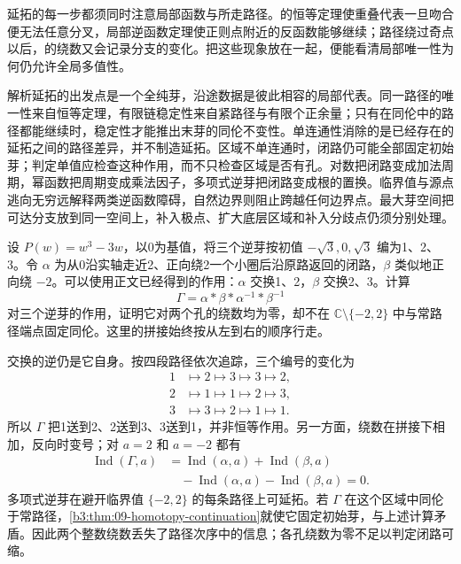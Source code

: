 \ProseParagraphBreak
延拓的每一步都须同时注意局部函数与所走路径。的恒等定理使重叠代表一旦吻合便无法任意分叉，局部逆函数定理使正则点附近的反函数能够继续；路径绕过奇点以后，的绕数又会记录分支的变化。把这些现象放在一起，便能看清局部唯一性为何仍允许全局多值性。





\begin{chaptersummary}
解析延拓的出发点是一个全纯芽，沿途数据是彼此相容的局部代表。同一路径的唯一性来自恒等定理，有限链稳定性来自紧路径与有限个正余量；只有在同伦中的路径都能继续时，稳定性才能推出末芽的同伦不变性。单连通性消除的是已经存在的延拓之间的路径差异，并不制造延拓。区域不单连通时，闭路仍可能全部固定初始芽；判定单值应检查这种作用，而不只检查区域是否有孔。对数把闭路变成加法周期，幂函数把周期变成乘法因子，多项式逆芽把闭路变成根的置换。临界值与源点逃向无穷远解释两类逆函数障碍，自然边界则阻止跨越任何边界点。最大芽空间把可达分支放到同一空间上，补入极点、扩大底层区域和补入分歧点仍须分别处理。
\end{chaptersummary}

\BookExercises

\begin{exercise}\label{b3:ex:09-1}
设 \(P(w)=w^3-3w\)，以0为基值，将三个逆芽按初值 \(-\sqrt3,0,\sqrt3\) 编为1、2、3。令 \(\alpha\) 为从0沿实轴走近2、正向绕2一个小圈后沿原路返回的闭路，\(\beta\) 类似地正向绕 \(-2\)。可以使用正文已经得到的作用：\(\alpha\) 交换1、2，\(\beta\) 交换2、3。计算
\[
 \Gamma=\alpha*\beta*\alpha^{-1}*\beta^{-1}
\]
对三个逆芽的作用，证明它对两个孔的绕数均为零，却不在 \(\mathbb C\setminus\{-2,2\}\) 中与常路径端点固定同伦。这里的拼接始终按从左到右的顺序行走。
\end{exercise}
\begin{solution}
交换的逆仍是它自身。按四段路径依次追踪，三个编号的变化为
\[
 \begin{aligned}
 1&\longmapsto2\longmapsto3\longmapsto3\longmapsto2,\\
 2&\longmapsto1\longmapsto1\longmapsto2\longmapsto3,\\
 3&\longmapsto3\longmapsto2\longmapsto1\longmapsto1.
 \end{aligned}
\]
所以 \(\Gamma\) 把1送到2、2送到3、3送到1，并非恒等作用。另一方面，绕数在拼接下相加，反向时变号；对 \(a=2\) 和 \(a=-2\) 都有
\[
 \begin{aligned}
 \operatorname{Ind}(\Gamma,a)
 &=\operatorname{Ind}(\alpha,a)+\operatorname{Ind}(\beta,a)\\
 &\quad-\operatorname{Ind}(\alpha,a)-\operatorname{Ind}(\beta,a)=0.
 \end{aligned}
\]
多项式逆芽在避开临界值 \(\{-2,2\}\) 的每条路径上可延拓。若 \(\Gamma\) 在这个区域中同伦于常路径，\cref{b3:thm:09-homotopy-continuation}就使它固定初始芽，与上述计算矛盾。因此两个整数绕数丢失了路径次序中的信息；各孔绕数为零不足以判定闭路可缩。
\end{solution}

